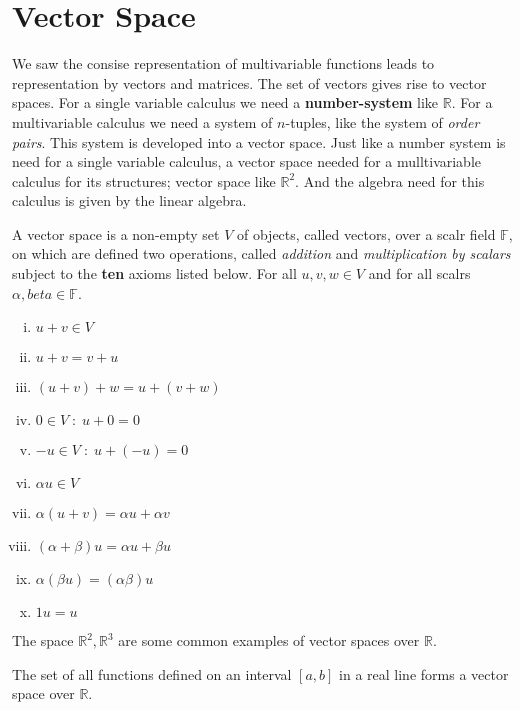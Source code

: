 \documentclass[aima104_lecturenotes_ku.tex]{subfiles}
\begin{document}
  \section{Vector Space}
  We saw the consise representation of multivariable functions leads to representation by vectors and matrices. The set of vectors gives rise to vector spaces. For a single variable calculus we need a \textbf{number-system} like $\mathbb{R}$. For a multivariable calculus we need a system of $n$-tuples, like the system of \textit{order pairs}. This system is developed into a vector space. Just like a number system is need for a single variable calculus, a vector space needed for a mulltivariable calculus for its structures; vector space like $\mathbb{R}^2$. And the algebra need for this calculus is given by the linear algebra.
  \begin{definition}
    A vector space is a non-empty set $V$ of objects, called vectors, over a scalr field $\mathbb{F}$, on which are defined two operations, called \textit{addition} and \textit{multiplication by scalars} subject to the \textbf{ten} axioms listed below. For all $u, v, w \in V$ and for all scalrs $\alpha, beta \in \mathbb{F}$.
    \begin{multicols}{2}
      \begin{enumerate}[i)]
    \item $u+v \in V$
      \item $u+v = v+u$
      \item $(u+v)+w = u +(v+w)$
      \item $0 \in V \; : \; u+0 =0$
      \item $-u \in V \; : \; u+(-u) = 0$

      \columnbreak

      \item $\alpha u \in V$
      \item $\alpha (u +v) = \alpha u + \alpha v$
      \item $(\alpha + \beta) u = \alpha u + \beta u$
      \item $\alpha (\beta u) = (\alpha \beta) u$
      \item $1u=u$
      \end{enumerate}
      \end{multicols}
    \end{definition}

  \begin{example}
    The space $\mathbb{R}^2, \mathbb{R}^3$ are some common examples of vector spaces over $\mathbb{R}$.
  \end{example}
  \begin{example}
 The set of all functions defined on an interval $[a,b]$ in a real line forms a vector space over $\mathbb{R}$.
  \end{example}
\end{document}
